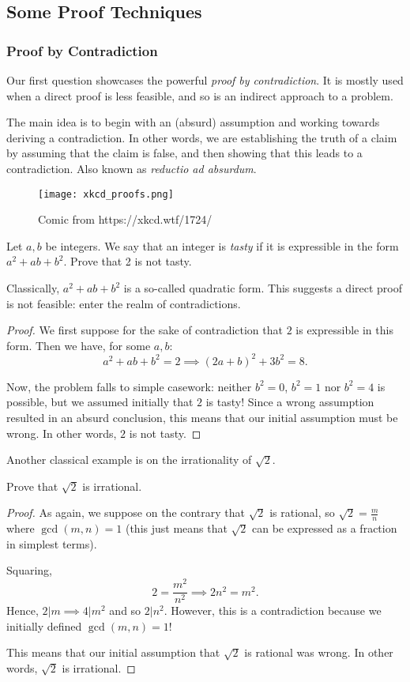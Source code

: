 \documentclass[../jarvis.tex]{subfiles}
\begin{document}
\subsection{Some Proof Techniques}
\subsubsection{Proof by Contradiction}
Our first question showcases the powerful \textit{proof by contradiction}. It is mostly used when a direct proof is less feasible, and so is an indirect approach to a problem.

The main idea is to begin with an (absurd) assumption and working towards deriving a contradiction. In other words, we are establishing the truth of a claim by assuming that the claim is false, and then showing that this leads to a contradiction. Also known as \textit{reductio ad absurdum}.
\begin{figure}[H]
    \centering
    \texttt{[image: xkcd\_proofs.png]}
    \caption{Comic from https://xkcd.wtf/1724/}
\end{figure}

\begin{example}[Classic]
Let $a, b$ be integers. We say that an integer is \textit{tasty} if it is expressible in the form $a^2+ab+b^2$. Prove that 2 is not tasty.
\end{example}
Classically, $a^2+ab+b^2$ is a so-called quadratic form. This suggests a direct proof is not feasible: enter the realm of contradictions.

\begin{proof}
We first suppose for the sake of contradiction that $2$ is expressible in this form. Then we have, for some $a,b$: 
$$a^2+ab+b^2=2 \implies (2a+b)^2+3b^2=8.$$

Now, the problem falls to simple casework: neither $b^2=0$, $b^2=1$ nor $b^2=4$ is possible, but we assumed initially that $2$ is tasty! Since a wrong assumption resulted in an absurd conclusion, this means that our initial assumption must be wrong. In other words, $2$ is not tasty.
\end{proof}

Another classical example is on the irrationality of $\sqrt{2}$. 
\begin{example}[Classic]
    Prove that $\sqrt{2}$ is irrational.
\end{example}
\begin{proof}
As again, we suppose on the contrary that $\sqrt{2}$ is rational, so $\sqrt{2}=\frac{m}{n}$ where $\gcd(m,n)=1$ (this just means that $\sqrt{2}$ can be expressed as a fraction in simplest terms).

Squaring, $$2=\frac{m^2}{n^2} \implies 2n^2=m^2.$$ Hence, $2|m \implies 4|m^2$ and so $2|n^2$. However, this is a contradiction because we initially defined $\gcd(m,n)=1$! 

This means that our initial assumption that $\sqrt{2}$ is rational was wrong. In other words, $\sqrt{2}$ is irrational.
\end{proof}
\end{document}

